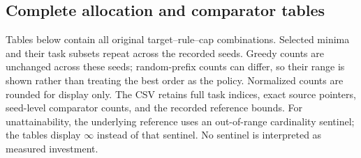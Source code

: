 \documentclass{article}
\begin{document}
\subsection{Complete allocation and comparator tables}
Tables below contain all original target--rule--cap combinations. Selected minima and their task subsets repeat across the recorded seeds. Greedy counts are unchanged across these seeds; random-prefix counts can differ, so their range is shown rather than treating the best order as the policy. Normalized counts are rounded for display only. The CSV retains full task indices, exact source pointers, seed-level comparator counts, and the recorded reference bounds. For unattainability, the underlying reference uses an out-of-range cardinality sentinel; the tables display $\infty$ instead of that sentinel. No sentinel is interpreted as measured investment.
\begingroup\small
\end{document}
